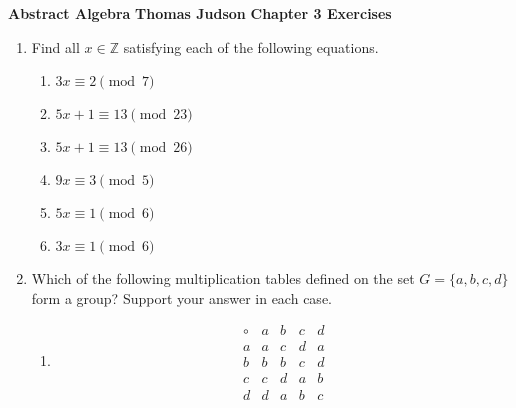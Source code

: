 \documentclass[12pt,reqno]{amsart}
\begin{document}
\thispagestyle{empty}


\noindent \textbf{Abstract Algebra} \hskip3cm {\bf Thomas Judson} \hfill {\bf Chapter 3 Exercises}
\medskip

\begin{enumerate}[{\bf 1.}]




\item
Find all $x \in {\mathbb Z}$ satisfying each of the following equations.
\begin{multicols}{2}
\begin{enumerate}

\item 
$3x \equiv 2 \pmod{ 7}$

\item
$5x + 1 \equiv 13 \pmod{ 23}$

\item
$5x + 1 \equiv 13 \pmod{ 26}$

\item
$9x \equiv 3 \pmod{ 5}$

\item
$5x \equiv 1 \pmod{ 6}$

\item
$3x \equiv 1 \pmod{ 6}$

\end{enumerate}
\end{multicols}
  

 
 \item   %
Which of the following multiplication tables defined on the set $G =
\{ a, b, c, d \}$ form a group? Support your answer in each case. 
\begin{multicols}{2}
\begin{enumerate}

\item
\[
\begin{array}{c|cccc}
\circ & a & b & c & d \\
\hline
a & a & c & d & a \\
b & b & b & c & d \\
c & c & d & a & b \\
d & d & a & b & c
\end{array}
\]




\end{enumerate}
\end{multicols}
\end{enumerate}
\end{document}
